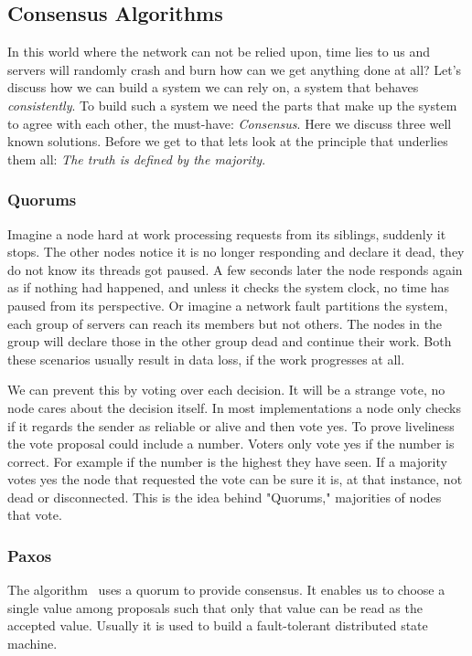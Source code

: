 \subsection{Consensus Algorithms}
In this world where the network can not be relied upon, time lies to us and servers will randomly crash and burn how can we get anything done at all? Let's discuss how we can build a system we can rely on, a system that behaves \textit{consistently}. To build such a system we need the parts that make up the system to agree with each other, the must-have: \emph{Consensus}. Here we discuss three well known solutions. Before we get to that lets look at the principle that underlies them all: \emph{The truth is defined by the majority}.

\subsubsection*{Quorums}
Imagine a node hard at work processing requests from its siblings, suddenly it stops. The other nodes notice it is no longer responding and declare it dead, they do not know its threads got paused. A few seconds later the node responds again as if nothing had happened, and unless it checks the system clock, no time has paused from its perspective. Or imagine a network fault partitions the system, each group of servers can reach its members but not others. The nodes in the group will declare those in the other group dead and continue their work. Both these scenarios usually result in data loss, if the work progresses at all.

We can prevent this by voting over each decision. It will be a strange vote, no node cares about the decision itself. In most implementations a node only checks if it regards the sender as reliable or alive and then vote yes. To prove liveliness the vote proposal could include a number. Voters only vote yes if the number is correct. For example if the number is the highest they have seen. If a majority votes yes the node that requested the vote can be sure it is, at that instance, not dead or disconnected. This is the idea behind "Quorums," majorities of nodes that vote.

\subsubsection*{Paxos}
The \paxos{} algorithm~\cite{paxos} uses a quorum to provide consensus. It enables us to choose a single value among proposals such that only that value can be read as the accepted value. Usually it is used to build a fault-tolerant distributed state machine. 


